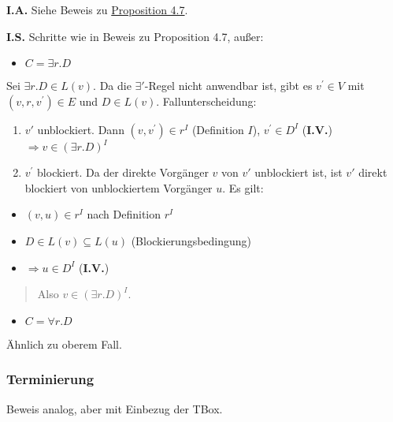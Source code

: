 \textbf{I.A.} Siehe Beweis zu
\protect\hyperlink{proposition-4.7-korrektheit}{Proposition 4.7}.

\textbf{I.S.} Schritte wie in Beweis zu Proposition 4.7, außer:

\begin{itemize}
\item
  $C = \exists r.D$
\end{itemize}

Sei $\exists r.D \in L\left( v \right)$. Da die $\exists'$-Regel
nicht anwendbar ist, gibt es $v^{'} \in V$ mit
$\left( v,r,v^{'} \right) \in E$ und $D \in L\left( v \right)$.
Fallunterscheidung:

\begin{enumerate}
\def\labelenumi{\arabic{enumi}.}
\item
  $v'$ unblockiert. Dann $\left( v,v^{'} \right) \in r^{I}$
  (Definition $I$), $v^{'} \in D^{I}$ (\textbf{I.V.})
  $\Rightarrow v \in \left( \exists r.D \right)^{I}$
\item
  $v^{'}$ blockiert. Da der direkte Vorgänger $v$ von $v'$
  unblockiert ist, ist $v'$ direkt blockiert von unblockiertem
  Vorgänger $u$. Es gilt:
\end{enumerate}

\begin{itemize}
\item
  $\left( v,u \right) \in r^{I}$ nach Definition $r^{I}$
\item
  $D \in L\left( v \right) \subseteq L\left( u \right)$
  (Blockierungsbedingung)
\item
  $\Rightarrow u \in D^{I}$ (\textbf{I.V.})
\end{itemize}

\begin{quote}
Also $v \in \left( \exists r.D \right)^{I}$.
\end{quote}

\begin{itemize}
\item
  $C = \forall r.D$
\end{itemize}

Ähnlich zu oberem Fall.

\subsubsection{Terminierung}\label{terminierung}

Beweis analog, aber mit Einbezug der TBox.